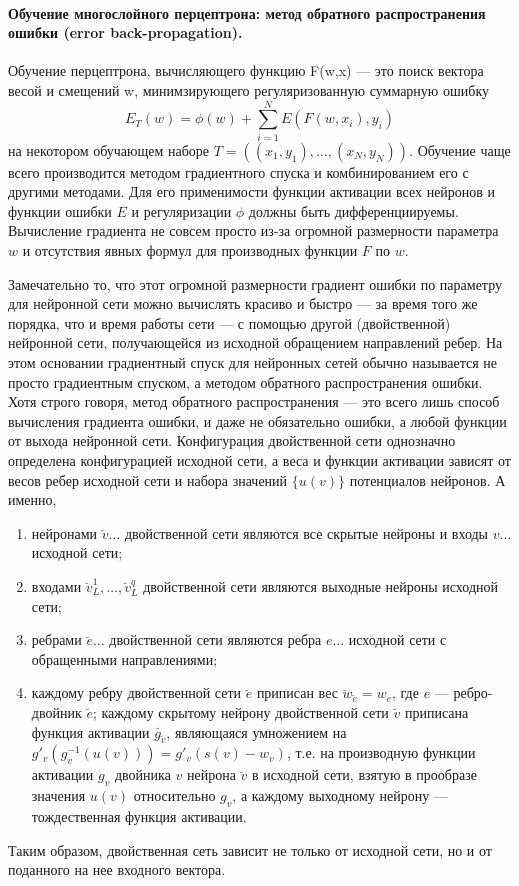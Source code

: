 \documentclass[a4paper,12pt]{report}
\numberwithin{equation}{section}
\begin{document}
\paragraph{Обучение многослойного перцептрона: метод обратного распространения ошибки (error back-propagation).}
Обучение перцептрона, вычисляющего функцию F(w,x) --- это поиск вектора весой и
смещений w, минимзирующего регуляризованную суммарную ошибку
\[ E_T(w) = \phi(w) + \sum_{i=1}^NE(F(w,x_i),y_i) \]
на некотором обучающем наборе $T = ((x_1,y_1),\dots,(x_N,y_N))$. Обучение чаще
всего производится методом градиентного спуска и комбинированием его с другими
методами. Для его применимости функции активации всех нейронов и функции ошибки
$E$ и регуляризации $\phi$ должны быть дифференциируемы. Вычисление градиента не
совсем просто из-за огромной размерности параметра $w$ и отсутствия явных формул
для производных функции $F$ по $w$.


Замечательно то, что этот огромной размерности градиент ошибки по параметру для
нейронной сети можно вычислять красиво и быстро — за время того же порядка, что
и время работы сети — с помощью другой (двойственной) нейронной сети,
получающейся из исходной обращением направлений ребер. На этом основании
градиентный спуск для нейронных сетей обычно называется не просто градиентным
спуском, а методом обратного распространения ошибки. Хотя строго говоря, метод
обратного распространения — это всего лишь способ вычисления градиента ошибки, и
даже не обязательно ошибки, а любой функции от выхода нейронной
сети. Конфигурация двойственной сети однозначно определена конфигурацией
исходной сети, а веса и функции активации зависят от весов ребер исходной сети и
набора значений $\{u(v)\}$ потенциалов нейронов. А именно,
\begin{enumerate}
\item нейронами $\breve{v}\dots$ двойственной сети являются все скрытые нейроны
и входы $v\dots$ исходной сети;
\item входами $\breve{v}_L^1,\dots,\breve{v}_L^q$ двойственной сети являются
выходные нейроны исходной сети;
\item ребрами $\breve{e}\dots$ двойственной сети являются ребра $e\dots$
исходной сети с обращенными направлениями;
\item каждому ребру двойственной сети $\breve{e}$ приписан вес
$\breve{w}_{\breve{e}} = w_e$, где $e$ --- ребро-двойник $\breve{e}$; каждому
скрытому нейрону двойственной сети $\breve{v}$ приписана функция активации
$\breve{g_{\breve{v}}}$, являющаяся умножением на $g'_v(g_v^{-1}(u(v))) =
g'_v(s(v) - w_v)$, т.е. на производную функции активации $g_v$ двойника $v$
нейрона $\breve{v}$ в исходной сети, взятую в прообразе значения $u(v)$
относительно $g_v$, а каждому выходному нейрону --- тождественная функция
активации.
\end{enumerate} Таким образом, двойственная сеть зависит не только от исходной
сети, но и от поданного на нее входного вектора.
\end{document}

